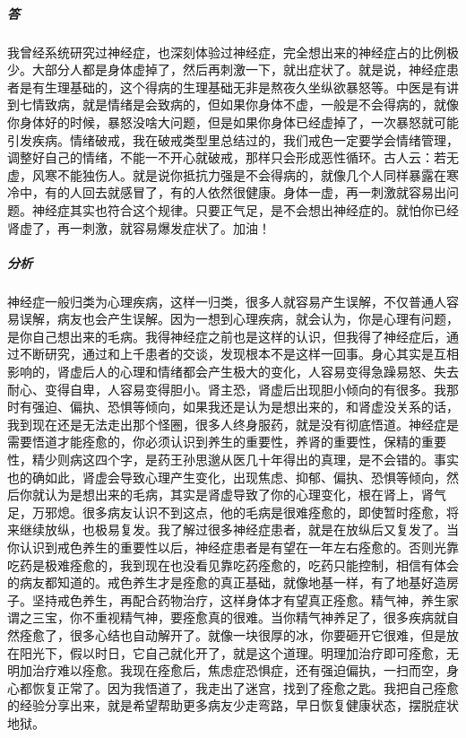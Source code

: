 \documentclass[fontset=founder]{ctexart}
\begin{document}
\begin{enumerate}
\begin{quote}
    \end{quote}
    \subparagraph{答} 我曾经系统研究过神经症，也深刻体验过神经症，完全想出来的神经症占的比例极少。大部分人都是身体虚掉了，然后再刺激一下，就出症状了。就是说，神经症患者是有生理基础的，这个得病的生理基础无非是熬夜久坐纵欲暴怒等。中医是有讲到七情致病，就是情绪是会致病的，但如果你身体不虚，一般是不会得病的，就像你身体好的时候，暴怒没啥大问题，但是如果你身体已经虚掉了，一次暴怒就可能引发疾病。情绪破戒，我在破戒类型里总结过的，我们戒色一定要学会情绪管理，调整好自己的情绪，不能一不开心就破戒，那样只会形成恶性循环。古人云：若无虚，风寒不能独伤人。就是说你抵抗力强是不会得病的，就像几个人同样暴露在寒冷中，有的人回去就感冒了，有的人依然很健康。身体一虚，再一刺激就容易出问题。神经症其实也符合这个规律。只要正气足，是不会想出神经症的。就怕你已经肾虚了，再一刺激，就容易爆发症状了。加油！
    \subparagraph{分析} 神经症一般归类为心理疾病，这样一归类，很多人就容易产生误解，不仅普通人容易误解，病友也会产生误解。因为一想到心理疾病，就会认为，你是心理有问题，是你自己想出来的毛病。我得神经症之前也是这样的认识，但我得了神经症后，通过不断研究，通过和上千患者的交谈，发现根本不是这样一回事。身心其实是互相影响的，肾虚后人的心理和情绪都会产生极大的变化，人容易变得急躁易怒、失去耐心、变得自卑，人容易变得胆小。肾主恐，肾虚后出现胆小倾向的有很多。我那时有强迫、偏执、恐惧等倾向，如果我还是认为是想出来的，和肾虚没关系的话，我到现在还是无法走出那个怪圈，很多人终身服药，就是没有彻底悟道。神经症是需要悟道才能痊愈的，你必须认识到养生的重要性，养肾的重要性，保精的重要性，精少则病这四个字，是药王孙思邈从医几十年得出的真理，是不会错的。事实也的确如此，肾虚会导致心理产生变化，出现焦虑、抑郁、偏执、恐惧等倾向，然后你就认为是想出来的毛病，其实是肾虚导致了你的心理变化，根在肾上，肾气足，万邪熄。很多病友认识不到这点，他的毛病是很难痊愈的，即使暂时痊愈，将来继续放纵，也极易复发。我了解过很多神经症患者，就是在放纵后又复发了。当你认识到戒色养生的重要性以后，神经症患者是有望在一年左右痊愈的。否则光靠吃药是极难痊愈的，我到现在也没看见靠吃药痊愈的，吃药只能控制，相信有体会的病友都知道的。戒色养生才是痊愈的真正基础，就像地基一样，有了地基好造房子。坚持戒色养生，再配合药物治疗，这样身体才有望真正痊愈。精气神，养生家谓之三宝，你不重视精气神，要痊愈真的很难。当你精气神养足了，很多疾病就自然痊愈了，很多心结也自动解开了。就像一块很厚的冰，你要砸开它很难，但是放在阳光下，假以时日，它自己就化开了，就是这个道理。明理加治疗即可痊愈，无明加治疗难以痊愈。我现在痊愈后，焦虑症恐惧症，还有强迫偏执，一扫而空，身心都恢复正常了。因为我悟道了，我走出了迷宫，找到了痊愈之匙。我把自己痊愈的经验分享出来，就是希望帮助更多病友少走弯路，早日恢复健康状态，摆脱症状地狱。
\end{enumerate}
\end{document}

